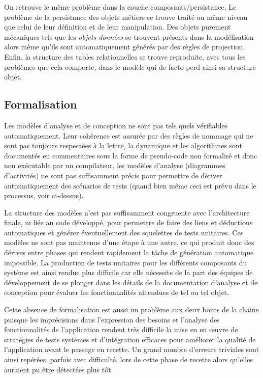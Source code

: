 On retrouve le m\^eme probl\`eme dans la couche
composants/persistance. Le probl\`eme de la persistance des objets
m\'etiers se trouve trait\'e au m\^eme niveau que celui de leur
d\'efinition et de leur manipulation. Des objets purement
m\'ecaniques  tels que les \emph{objets donn\'ees} se trouvent
pr\'esents dans la mod\'elisation alors m\^eme qu'ils sont
automatiquement g\'en\'er\'es par des r\`egles de projection. Enfin, la structure des tables relationnelles se trouve reproduite,
avec tous les probl\`emes que cela comporte, dans le mod\`ele qui de
facto perd ainsi sa structure objet.

\subsection{Formalisation}

Les mod\`eles d'analyse et de conception ne sont pas tels
quels v\'erifiables automatiquement. Leur coh\'erence est assur\'ee par des
r\`egles de nommage qui ne sont pas toujours respect\'ees \`a la
lettre, la dynamique et les algorithmes sont document\'es en
commentaires sous la forme de pseudo-code non formalis\'e et donc non
ex\'ecutable par un compilateur, les mod\`eles d'analyse (diagrammes
d'activit\'es) ne sont pas suffisamment pr\'ecis pour permettre de
d\'eriver automatiquement des sc\'enarios de tests (quand bien
m\^eme ceci est pr\'evu dans le processus, voir ci-dessus).

La structure des mod\`eles n'est pas suffisamment congruente
avec l'architecture finale, ni li\'ee au code d\'evelopp\'e, pour
permettre de faire des liens et d\'eductions automatiques et
g\'en\'erer \'eventuellement des squelettes de tests unitaires. Ces
mod\`eles ne sont pas maintenus d'une \'etape \`a une autre, ce
qui produit donc des d\'erives entre phases qui rendent rapidement la
t\^ache de g\'en\'eration automatique impossible. La production de
tests unitaires pour les diff\'erents composants du syst\`eme est
ainsi rendue plus difficile car elle n\'ecessite de la part des
\'equipes de d\'eveloppement de se plonger dans les d\'etails de
la documentation d'analyse et de conception pour \'evaluer les
fonctionnalit\'es attendues de tel ou tel objet. 

Cette absence de formalisation est aussi un probl\`eme aux deux bouts
de la cha\^{\i}ne puisque les impr\'ecisions dans l'expression des
besoins et l'analyse des fonctionnalit\'es de l'application rendent
tr\`es difficile la mise en en \oe uvre de strat\'egies de tests
syst\`emes et d'int\'egration efficaces pour am\'eliorer la
qualit\'e de l'application avant le passage en recette. Un grand
nombre d'erreurs triviales sont ainsi rep\'er\'ees, parfois avec
difficult\'e, lors de cette phase de recette alors qu'elles auraient
pu \^etre d\'etect\'ees plus t\^ot. 

